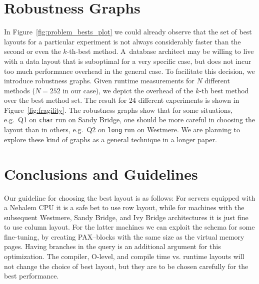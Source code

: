 \documentclass{sig-alternate}
\begin{document}
\vspace*{-0.2cm}

\section{Robustness Graphs}

In Figure~\ref{fig:problem_bests_plot} we could already observe that the set of best layouts for a particular experiment is not always considerably faster than the second or even the $k$-th-best method. A~database architect may be willing to live with a data layout that is suboptimal for a very specific case, but does not incur too much performance overhead in the general case. To facilitate this decision, we introduce robustness graphs. Given runtime measurements for $N$ different methods ($N=252$ in our case), we depict the overhead of the $k$-th best method over the best method set. The result for 24 different experiments is shown in Figure~\ref{fig:fragility}. The robustness graphs show that for some situations, e.g.~Q1 on \texttt{char} run on Sandy Bridge, one should be more careful in choosing the layout than in others, e.g.~Q2 on \texttt{long} run on Westmere. We are planning to explore these kind of graphs as a general technique in a longer  paper.

\section{Conclusions and Guidelines}

Our guideline for choosing the best layout is as follows:
For servers equipped with a Nehalem CPU it is a safe bet to use row layout, while for machines with the subsequent Westmere, Sandy Bridge, and Ivy Bridge architectures it is just fine to use column layout. For the latter machines we can exploit the schema for some fine-tuning, by creating PAX--blocks with the same size as the virtual memory pages. Having branches in the query is an additional argument for this optimization. The compiler, O-level, and compile time vs. runtime layouts will not change the choice of best layout, but they are to be chosen carefully for the best performance.
\end{document}

